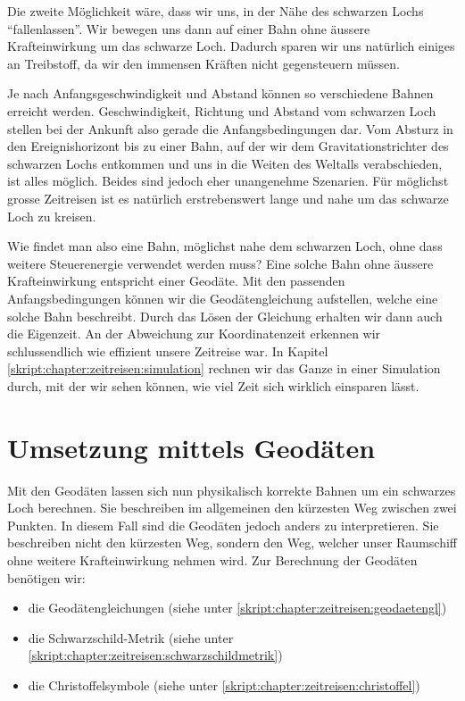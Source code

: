 \begin{refsection}
	Die zweite Möglichkeit wäre, dass wir uns, in der Nähe des schwarzen Lochs ``fallenlassen''. Wir bewegen uns dann auf einer Bahn ohne äussere Krafteinwirkung um das schwarze Loch. Dadurch sparen wir uns natürlich einiges an Treibstoff, da wir den immensen Kräften nicht gegensteuern müssen. 
    
    Je nach Anfangsgeschwindigkeit und Abstand können so verschiedene Bahnen erreicht werden. Geschwindigkeit, Richtung und Abstand vom schwarzen Loch stellen bei der Ankunft also gerade die Anfangsbedingungen dar. Vom Absturz in den Ereignishorizont bis zu einer Bahn, auf der wir dem Gravitationstrichter des schwarzen Lochs entkommen und uns in die Weiten des Weltalls verabschieden, ist alles möglich. Beides sind jedoch eher unangenehme Szenarien. Für möglichst grosse Zeitreisen ist es natürlich erstrebenswert lange und nahe um das schwarze Loch zu kreisen.
	
	Wie findet man also eine Bahn, möglichst nahe dem schwarzen Loch, ohne dass weitere Steuerenergie verwendet werden muss?
    Eine solche Bahn ohne äussere Krafteinwirkung entspricht einer Geodäte. Mit den passenden Anfangsbedingungen können wir die Geodätengleichung aufstellen, welche eine solche Bahn beschreibt. Durch das Lösen der Gleichung erhalten wir dann auch die Eigenzeit. An der Abweichung zur Koordinatenzeit erkennen wir schlussendlich wie effizient unsere Zeitreise war.
    In Kapitel \ref{skript:chapter:zeitreisen:simulation} rechnen wir das Ganze in einer Simulation durch, mit der wir sehen können, wie viel Zeit sich wirklich einsparen lässt.
	
	\section{Umsetzung mittels Geodäten}
	Mit den Geodäten lassen sich nun physikalisch korrekte Bahnen um ein schwarzes Loch berechnen. Sie beschreiben im allgemeinen den kürzesten Weg zwischen zwei Punkten. In diesem Fall sind die Geodäten jedoch anders zu interpretieren. Sie beschreiben nicht den kürzesten Weg, sondern den Weg, welcher unser Raumschiff ohne weitere Krafteinwirkung nehmen wird.
	Zur Berechnung der Geodäten benötigen wir:
	\begin{itemize}
		\item die Geodätengleichungen (siehe unter \ref{skript:chapter:zeitreisen:geodaetengl})
		\item die Schwarzschild-Metrik (siehe unter \ref{skript:chapter:zeitreisen:schwarzschildmetrik})
		\item die Christoffelsymbole (siehe unter \ref{skript:chapter:zeitreisen:christoffel})
	\end{itemize}


\end{refsection}
